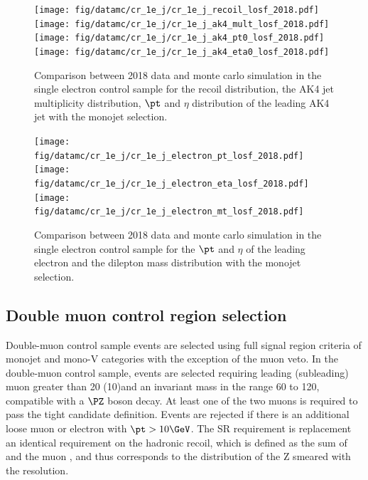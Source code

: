 {\begin{figure}[htbp]
    \begin{center}
        \texttt{[image: fig/datamc/cr\_1e\_j/cr\_1e\_j\_recoil\_losf\_2018.pdf]}
        \texttt{[image: fig/datamc/cr\_1e\_j/cr\_1e\_j\_ak4\_mult\_losf\_2018.pdf]} \\
        \texttt{[image: fig/datamc/cr\_1e\_j/cr\_1e\_j\_ak4\_pt0\_losf\_2018.pdf]}
        \texttt{[image: fig/datamc/cr\_1e\_j/cr\_1e\_j\_ak4\_eta0\_losf\_2018.pdf]}
    \end{center}
    \caption{Comparison between 2018 data and monte carlo simulation in the single electron control sample for
        the recoil distribution, the AK4 jet multiplicity distribution,  $\pt$ and $\eta$ distribution
        of the leading AK4  jet with the monojet selection.}
    \label{fig:SE_monojet_2018}
\end{figure}

\begin{figure}[htbp]
    \begin{center}
        \texttt{[image: fig/datamc/cr\_1e\_j/cr\_1e\_j\_electron\_pt\_losf\_2018.pdf]}
        \texttt{[image: fig/datamc/cr\_1e\_j/cr\_1e\_j\_electron\_eta\_losf\_2018.pdf]} \\
        \texttt{[image: fig/datamc/cr\_1e\_j/cr\_1e\_j\_electron\_mt\_losf\_2018.pdf]}
    \end{center}
    \caption{Comparison between 2018 data and monte carlo simulation in the single electron control sample for
        the $\pt$ and $\eta$ of the leading electron and the dilepton mass distribution with the monojet selection.}
    \label{fig:SE_2_monojet_2018}
\end{figure}

\newpage

\subsection{Double muon control region selection}
\label{sec:selection_cr_2m}
Double-muon control sample events are selected using full signal region criteria of monojet and mono-V categories with the exception of the muon veto. 
In the double-muon control sample, events are selected requiring leading (subleading) muon \pt greater than 20 (10)\GeV and an invariant mass in the range 60 to 120\GeV, compatible with a $\PZ$ boson decay. At least one of the two muons is required to pass the tight candidate definition. Events are rejected if there is an additional loose muon or electron with $\pt > 10\GeV$. The SR \ptmiss requirement is replacement an identical requirement on the hadronic recoil, which is defined as the sum of \ptvecmiss and the muon \vpt, and thus corresponds to the distribution of the Z \pt smeared with the \ptmiss resolution.

}
